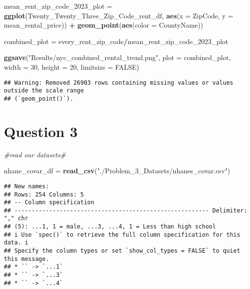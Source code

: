 \documentclass[
]{article}
\newenvironment{Shaded}{\begin{snugshade}}{\end{snugshade}}
\newcommand{\AttributeTok}[1]{\textcolor[rgb]{0.13,0.29,0.53}{#1}}
\newcommand{\CommentTok}[1]{\textcolor[rgb]{0.56,0.35,0.01}{\textit{#1}}}
\newcommand{\ConstantTok}[1]{\textcolor[rgb]{0.56,0.35,0.01}{#1}}
\newcommand{\DecValTok}[1]{\textcolor[rgb]{0.00,0.00,0.81}{#1}}
\newcommand{\FunctionTok}[1]{\textcolor[rgb]{0.13,0.29,0.53}{\textbf{#1}}}
\newcommand{\NormalTok}[1]{#1}
\newcommand{\OtherTok}[1]{\textcolor[rgb]{0.56,0.35,0.01}{#1}}
\newcommand{\SpecialCharTok}[1]{\textcolor[rgb]{0.81,0.36,0.00}{\textbf{#1}}}
\newcommand{\StringTok}[1]{\textcolor[rgb]{0.31,0.60,0.02}{#1}}
\begin{document}
\begin{Shaded}
\begin{Highlighting}[]
\NormalTok{mean\_rent\_zip\_code\_2023\_plot }\OtherTok{=} \FunctionTok{ggplot}\NormalTok{(Twenty\_Twenty\_Three\_Zip\_Code\_rent\_df, }\FunctionTok{aes}\NormalTok{(}\AttributeTok{x =}\NormalTok{ ZipCode, }\AttributeTok{y =}\NormalTok{ mean\_rental\_price)) }\SpecialCharTok{+} \FunctionTok{geom\_point}\NormalTok{(}\FunctionTok{aes}\NormalTok{(}\AttributeTok{color =}\NormalTok{ CountyName))}

\NormalTok{combined\_plot }\OtherTok{=}\NormalTok{ every\_rent\_zip\_code}\SpecialCharTok{/}\NormalTok{mean\_rent\_zip\_code\_2023\_plot}

\FunctionTok{ggsave}\NormalTok{(}\StringTok{"Results/nyc\_combined\_rental\_trend.png"}\NormalTok{, }\AttributeTok{plot =}\NormalTok{ combined\_plot, }\AttributeTok{width =} \DecValTok{30}\NormalTok{, }\AttributeTok{height =} \DecValTok{20}\NormalTok{, }\AttributeTok{limitsize =} \ConstantTok{FALSE}\NormalTok{)}
\end{Highlighting}
\end{Shaded}

\begin{verbatim}
## Warning: Removed 26903 rows containing missing values or values outside the scale range
## (`geom_point()`).
\end{verbatim}

\section{Question 3}\label{question-3}

\begin{Shaded}
\begin{Highlighting}[]
\CommentTok{\#read our datasets\#}

\NormalTok{nhane\_covar\_df }\OtherTok{=} \FunctionTok{read\_csv}\NormalTok{(}\StringTok{"./Problem\_3\_Datasets/nhanes\_covar.csv"}\NormalTok{)}
\end{Highlighting}
\end{Shaded}

\begin{verbatim}
## New names:
## Rows: 254 Columns: 5
## -- Column specification
## -------------------------------------------------------- Delimiter: "," chr
## (5): ...1, 1 = male, ...3, ...4, 1 = Less than high school
## i Use `spec()` to retrieve the full column specification for this data. i
## Specify the column types or set `show_col_types = FALSE` to quiet this message.
## * `` -> `...1`
## * `` -> `...3`
## * `` -> `...4`
\end{verbatim}
\end{document}
